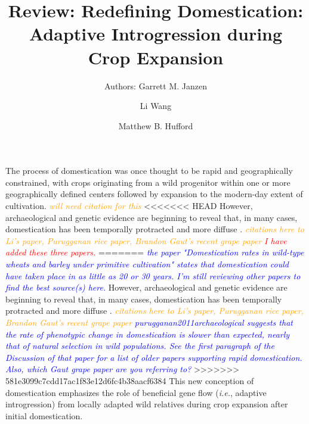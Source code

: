 \documentclass[11pt]{article}
\title{Review: Redefining Domestication: Adaptive Introgression during Crop Expansion}
\author[1]{Authors: Garrett M. Janzen}%
\author[1]{Li Wang}
\author[1,*]{Matthew B. Hufford}
\affil[1]{Department of Ecology, Evolution, and Organismal Biology, Iowa State University, Ames, Iowa, USA}
\affil[*]{Correspondence: mhufford@iastate.edu (M.B. Hufford)}
\date{}
\newcommand{\mbh}[1]{\textcolor{orange}{ \emph{\scriptsize  #1}} } %
\newcommand{\lwang}[1]{\textcolor{red}{ \emph{\scriptsize  #1}} } %
\newcommand{\gmj}[1]{\textcolor{blue}{ \emph{\scriptsize  #1}} } %
\begin{document}
\maketitle



The process of domestication was once thought to be rapid and geographically constrained, with crops originating from a wild progenitor within one or more geographically defined centers followed by expansion to the modern-day extent of cultivation. \mbh{will need citation for this}
<<<<<<< HEAD
However, archaeological and genetic evidence are beginning to reveal that, in many cases, domestication has been temporally protracted and more diffuse \cite{brown2009complex, Meyer2016, wang2017, zhou2017}. \mbh{citations here to Li's paper, Purugganan rice paper, Brandon Gaut's recent grape paper} \lwang{I have added these three papers.}
=======
\gmj{ the paper "Domestication rates in wild-type wheats and barley under primitive cultivation" states that domestication could have taken place in as little as 20 or 30 years.  I'm still reviewing other papers to find the best source(s) here.}
However, archaeological and genetic evidence are beginning to reveal that, in many cases, domestication has been temporally protracted and more diffuse \cite{brown2009complex}. \mbh{citations here to Li's paper, Purugganan rice paper, Brandon Gaut's recent grape paper}
\gmj{purugganan2011archaeological suggests that the rate of phenotypic change in domestication is slower than expected, nearly that of natural selection in wild populations. See the first paragraph of the Discussion of that paper for a list of older papers supporting rapid domestication.  Also, which Gaut grape paper are you referring to?}
>>>>>>> 581e3099c7cdd17ac1f83e12d6fc4b38aacf6384
This new conception of domestication emphasizes the role of beneficial gene flow (\emph{i.e.}, adaptive introgression) from locally adapted wild relatives during crop expansion after initial domestication.
\end{document}
